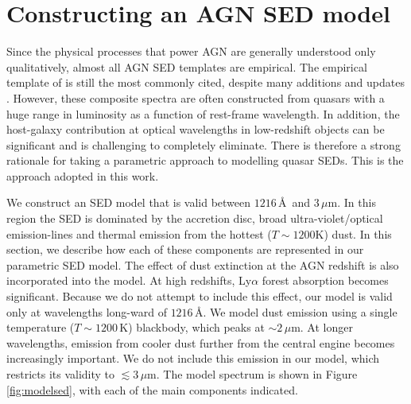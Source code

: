 \section{Constructing an AGN SED model}

Since the physical processes that power AGN are generally understood only qualitatively, almost all AGN SED templates are empirical.
The empirical template of \citet{elvis94} is still the most commonly cited, despite many additions and updates \citep[e.g.][]{polletta00, kuraszkiewicz03, risaliti04, richards06,  polletta07, lusso10, shang11, marchese12, trichas12}.
However, these composite spectra are often constructed from quasars with a huge range in luminosity as a function of rest-frame wavelength.
In addition, the host-galaxy contribution at optical wavelengths in low-redshift objects can be significant and is challenging to completely eliminate.
There is therefore a strong rationale for taking a parametric approach to modelling quasar SEDs.
This is the approach adopted in this work.

We construct an SED model that is valid between $1216$\,\AA\, and $3$\,$\mu$m.
In this region the SED is dominated by the accretion disc, broad ultra-violet/optical emission-lines and thermal emission from the hottest ($T\sim1200$K) dust.
In this section, we describe how each of these components are represented in our parametric SED model.
The effect of dust extinction at the AGN redshift is also incorporated into the model.
At high redshifts, Ly$\alpha$ forest absorption becomes significant.
Because we do not attempt to include this effect, our model is valid only at wavelengths long-ward of $1216$\,\AA.
We model dust emission using a single temperature ($T\sim1200$\,K) blackbody, which peaks at $\sim2$\,$\mu$m.
At longer wavelengths, emission from cooler dust further from the central engine becomes increasingly important.
We do not include this emission in our model, which restricts its validity to $\lesssim3$\,$\mu$m.
The model spectrum is shown in Figure \ref{fig:modelsed}, with each of the main components indicated.

